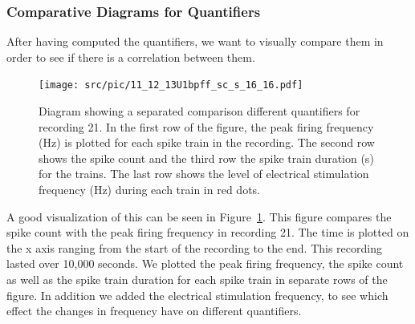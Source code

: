 \subsubsection{Comparative Diagrams for Quantifiers}
After having computed the quantifiers, we want to visually compare them in order to see if there is a correlation between them.
\begin{figure}
	\texttt{[image: src/pic/11\_12\_13U1bpff\_sc\_s\_16\_16.pdf]}
	\caption{Diagram showing a separated comparison different quantifiers for recording 21. In the first row of the figure, the peak firing frequency (Hz) is plotted for each spike train in the recording. The second row shows the spike count and the third row the spike train duration (s) for the trains. The last row shows the level of electrical stimulation frequency (Hz) during each train in red dots.}
	\label{fig:quantcomp_sp}
\end{figure}

A good visualization of this can be seen in Figure~\ref{fig:quantcomp_sp}. This figure compares the spike count with the peak firing frequency in recording 21. The time is plotted on the x axis ranging from the start of the recording to the end. This recording lasted over 10,000 seconds. We plotted the peak firing frequency, the spike count as well as the spike train duration for each spike train in separate rows of the figure. In addition we added the electrical stimulation frequency, to see which effect the changes in frequency have on different quantifiers. 

